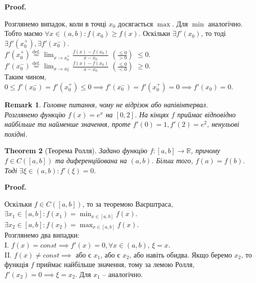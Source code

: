 \documentclass[a4paper, 14pt]{article}
\makeatletter
\def\qed{$\blacksquare$}
\theoremstyle{theoremdd}
\newtheorem{theorem}{Theorem}[subsection]
\theoremstyle{theoremdd}
\theoremstyle{theoremdd}
\theoremstyle{theoremdd}
\theoremstyle{theoremdd}
\theoremstyle{theoremdd}
\newtheorem{remark}[theorem]{Remark}
\theoremstyle{theoremdd}
\theoremstyle{theoremdd}
\renewenvironment{proof}[1][Proof.\\]{\par
\pushQED{\hfill \qed}%
\normalfont \topsep6\p@\@plus6\p@\relax
\trivlist
\item\relax
{\bfseries
#1\@addpunct{.}}\hspace\labelsep\ignorespaces
}{%
\popQED\endtrivlist\@endpefalse
}
\makeatother
\begin{document}
\begin{proof}
Розглянемо випадок, коли в точці $x_0$ досягається $\max$. Для $\min$ аналогічно.\\
Тобто маємо $\forall x \in (a,b): f(x_0) \geq f(x)$. Оскільки $\exists f'(x_0)$, то тоді $\exists f'(x_0^+), \exists f'(x_0^-)$.\\
$f'(x_0^+) \displaystyle \overset{\textrm{def.}}{=} \lim_{x \to x_0^+} \frac{f(x)-f(x_0)}{x-x_0}$  $\left( \frac{\leq 0}{> 0} \right)$ $\leq 0$.\\
$f'(x_0^-) \displaystyle \overset{\textrm{def.}}{=} \lim_{x \to x_0^-} \frac{f(x)-f(x_0)}{x-x_0}$ $\left( \frac{\leq 0}{< 0} \right)$ $\geq 0$.\\
Таким чином, $0 \leq f'(x_0^-) = f'(x_0^+) \leq 0 \implies f'(x_0^-) = f'(x_0^+) = 0 \implies f'(x_0) = 0$.
\\ %
\end{proof}

\begin{remark}
Головне питання, чому не відрізок або напівінтервал.\\
Розглянемо функцію $f(x) = e^x$ на $[0,2]$. На кінцях $f$ приймає відповідно найбільше та найменше значення, проте $f'(0) = 1, f'(2) = e^2$, ненульові похідні.
\end{remark}

\begin{theorem}[Теорема Ролля]
Задано функцію $f \colon [a,b] \to \mathbb{R}$, причому $f \in C([a,b])$ та диференційована на $(a,b)$. Більш того, $f(a) = f(b)$. Тоді $\exists \xi \in (a,b): f'(\xi) = 0$.
\end{theorem}

\begin{proof}
Оскільки $f \in C([a,b])$, то за теоремою Ваєрштраса,\\
$\exists x_1 \in [a,b]: f(x_1) = \displaystyle \min_{x \in [a,b]} f(x)$.\\
$\exists x_2 \in [a,b]: f(x_2) = \displaystyle \max_{x \in [a,b]} f(x)$.\\
Розглянемо два випадки:\\
I. $f(x) = const \implies f'(x) = 0, \forall x \in (a,b)$, $\xi = x$.\\
II. $f(x) \neq const \implies$ або є $x_1$, або є $x_2$, або навіть обидва. Якщо беремо $x_2$, то функція $f$ приймає найбільше значення, тому за лемою Ролля, $f'(x_2) = 0 \implies \xi = x_2$. Для $x_1$ -- аналогічно.
\end{proof}
\end{document}
